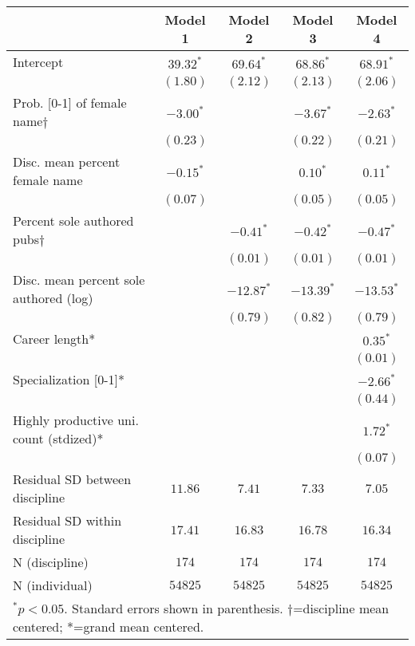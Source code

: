 \documentclass[
  10pt,
  letterpaper,
]{article}
\begin{document}
\begin{table}
{\begin{tabular}{l c c c c}
\hline
 & Model 1 & Model 2 & Model 3 & Model 4 \\
\hline
Intercept                               & $39.32^{*}$ & $69.64^{*}$  & $68.86^{*}$  & $68.91^{*}$  \\
                                        & $(1.80)$    & $(2.12)$     & $(2.13)$     & $(2.06)$     \\
Prob. [0-1] of female name$\dagger$     & $-3.00^{*}$ &              & $-3.67^{*}$  & $-2.63^{*}$  \\
                                        & $(0.23)$    &              & $(0.22)$     & $(0.21)$     \\
Disc. mean percent female name          & $-0.15^{*}$ &              & $0.10^{*}$   & $0.11^{*}$   \\
                                        & $(0.07)$    &              & $(0.05)$     & $(0.05)$     \\
Percent sole authored pubs$\dagger$     &             & $-0.41^{*}$  & $-0.42^{*}$  & $-0.47^{*}$  \\
                                        &             & $(0.01)$     & $(0.01)$     & $(0.01)$     \\
Disc. mean percent sole authored (log)  &             & $-12.87^{*}$ & $-13.39^{*}$ & $-13.53^{*}$ \\
                                        &             & $(0.79)$     & $(0.82)$     & $(0.79)$     \\
Career length*                          &             &              &              & $0.35^{*}$   \\
                                        &             &              &              & $(0.01)$     \\
Specialization [0-1]*                   &             &              &              & $-2.66^{*}$  \\
                                        &             &              &              & $(0.44)$     \\
Highly productive uni. count (stdized)* &             &              &              & $1.72^{*}$   \\
                                        &             &              &              & $(0.07)$     \\
\hline
Residual SD between discipline          & $11.86$     & $7.41$       & $7.33$       & $7.05$       \\
Residual SD within discipline           & $17.41$     & $16.83$      & $16.78$      & $16.34$      \\
N (discipline)                          & $174$       & $174$        & $174$        & $174$        \\
N (individual)                          & $54825$     & $54825$      & $54825$      & $54825$      \\
\hline
\multicolumn{5}{l}{\scriptsize{$^{*}p<0.05$. Standard errors shown in parenthesis. $\dagger$=discipline mean centered; *=grand mean centered.}}
\end{tabular}
}

\end{table}%
\end{document}
